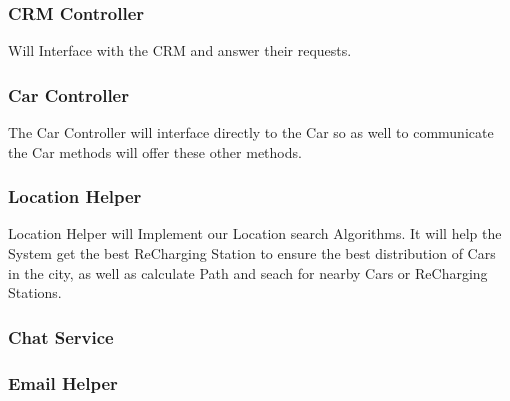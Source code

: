 \documentclass[a4paper]{article}
\begin{document}
\subsubsection{CRM Controller}
Will Interface with the CRM and answer their requests.
\begin{figure}[h]
\centering
\vspace*{\fill}
\noindent{}%
\vspace*{0.1cm}
\end{figure}

\subsubsection{Car Controller}
The Car Controller will interface directly to the Car so as well to communicate the Car methods will offer these other methods.
\begin{figure}[h]
\centering
\vspace*{\fill}
\noindent{}%
\vspace*{0.1cm}
\end{figure}

\subsubsection{Location Helper}
Location Helper will Implement our Location search Algorithms. It will help the System get the best ReCharging Station to ensure the best distribution of Cars in the city, as well as calculate Path and seach for nearby Cars or ReCharging Stations.
\begin{figure}[h]
\centering
\vspace*{\fill}
\noindent{}%
\vspace*{0.1cm}
\end{figure}

\subsubsection{Chat Service}
\begin{figure}[h]
\centering
\vspace*{\fill}
\noindent{}
\vspace*{0.1cm}
\end{figure}

\subsubsection{Email Helper}
\begin{figure}[h]
\centering
\vspace*{\fill}
\noindent{}%
\vspace*{0.1cm}
\end{figure}
\end{document}
